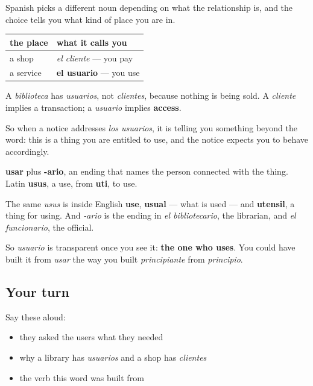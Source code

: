 \begin{grammarlens}[title={Grammar Lens: the word a service reaches for}]
Spanish picks a different noun depending on what the relationship is, and the choice tells you what kind of place you are in.

\noindent
\begin{tabularx}{\linewidth}{@{}>{\raggedright\arraybackslash}X>{\raggedright\arraybackslash}X@{}}
\toprule
\textbf{the place} & \textbf{what it calls you} \\
\midrule
a shop & \emph{el cliente} — you pay \\
a service & \textbf{el usuario} — you use \\
\bottomrule
\end{tabularx}

A \emph{biblioteca} has \emph{usuarios}, not \emph{clientes}, because nothing is being sold. A \emph{cliente} implies a transaction; a \emph{usuario} implies \textbf{access}.

So when a notice addresses \emph{los usuarios}, it is telling you something beyond the word: this is a thing you are entitled to use, and the notice expects you to behave accordingly.
\end{grammarlens}

\begin{cousinweb}
\textbf{usar} plus \textbf{-ario}, an ending that names the person connected with the thing. Latin \textbf{usus}, a use, from \textbf{uti}, to use.

The same \emph{usus} is inside English \textbf{use}, \textbf{usual} — what is used — and \textbf{utensil}, a thing for using. And \emph{-ario} is the ending in \emph{el bibliotecario}, the librarian, and \emph{el funcionario}, the official.

So \emph{usuario} is transparent once you see it: \textbf{the one who uses}. You could have built it from \emph{usar} the way you built \emph{principiante} from \emph{principio}.
\end{cousinweb}

\subsection*{Your turn}
Say these aloud:

\begin{itemize}
\raggedright
  \item they asked the users what they needed
  \item why a library has \emph{usuarios} and a shop has \emph{clientes}
  \item the verb this word was built from
\end{itemize}

